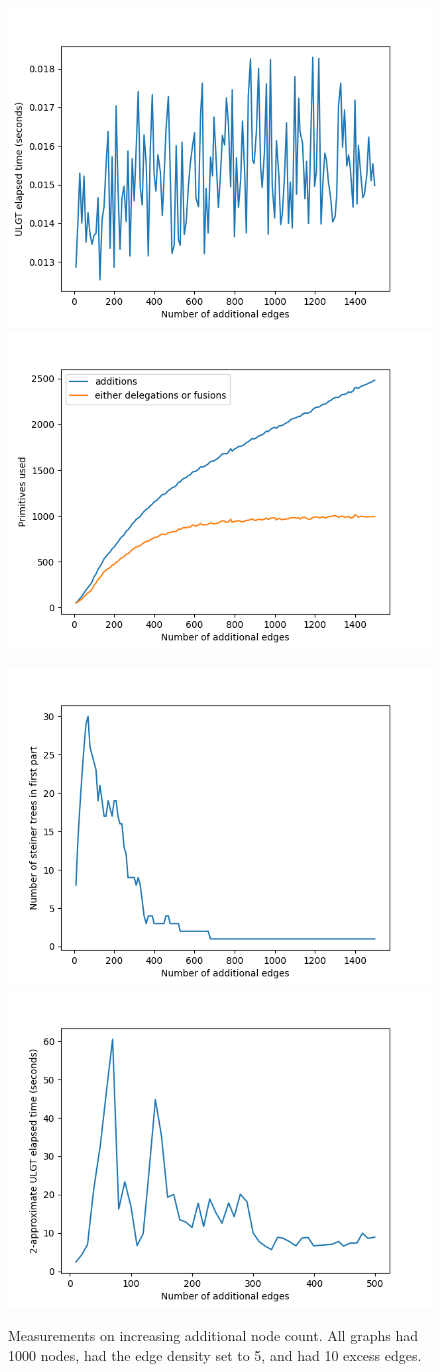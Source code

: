 \documentclass{article}
\begin{document}
\begin{landscape}
\begin{figure}
  \vspace{-1.7cm}
  \centering
  \includegraphics[width=0.48\columnwidth]{figures/additional_edge_time.png}
  \includegraphics[width=0.48\columnwidth]{figures/additional_edge_primitives.png}
  
  \includegraphics[width=0.48\columnwidth]{figures/additional_edge_steiner.png}
  \includegraphics[width=0.48\columnwidth]{figures/additional_edge_contraction_time.png}

  \caption{Measurements on increasing additional node count. All graphs had 1000 nodes, had the edge density set to 5, and had 10 excess edges.}
  \label{fig:additional-edges}
\end{figure}
\end{landscape}
  
\end{document}
